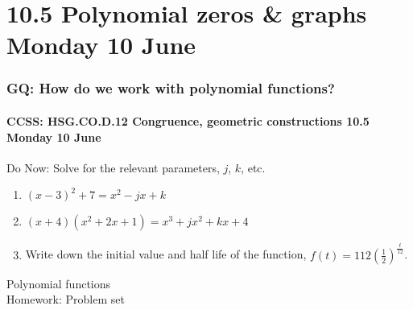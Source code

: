 \documentclass{beamer}
\begin{document}
  \section{10.5 Polynomial zeros \& graphs Monday 10 June}
    \frame
    {
      \frametitle{GQ: How do we work with polynomial functions?}
      \framesubtitle{CCSS: HSG.CO.D.12 Congruence, geometric constructions \hfill \alert{10.5 Monday 10 June}}

      \begin{block}{Do Now: Solve for the relevant parameters, $j$, $k$, etc.}
        \begin{enumerate}
          \item $(x-3)^2+7=x^2-jx+k$
          \item $(x+4)(x^2+2x+1)=x^3+jx^2+kx+4$
          \item Write down the initial value and half life of the function, $\displaystyle f(t)=112 \left( \frac{1}{2} \right)^{\frac{t}{12}}$. 
        \end{enumerate}
      \end{block}
      Polynomial functions\\[0.25cm]
      Homework: Problem set
    }
\end{document}
